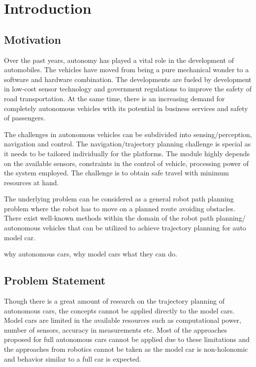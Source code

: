 \chapter{Introduction}
\label{introduction}
\section{Motivation}

Over the past years, autonomy has played a vital role in the development of automobiles. The vehicles have moved from being a pure mechanical wonder to a software and hardware combination. The developments are fueled by development in low-cost sensor technology and government regulations to improve the safety of road transportation. At the same time, there is an increasing demand for completely autonomous vehicles with its potential in business services and safety of passengers.

The challenges in autonomous vehicles can be subdivided into sensing/perception, navigation and control. The navigation/trajectory planning challenge is special as it needs to be tailored individually for the platforms. The module highly depends on the available sensors, constraints in the control of vehicle, processing power of the system employed.  The challenge is to obtain safe travel with minimum resources at hand. 

The underlying problem can be considered as a general robot path planning problem where the robot has to move on a planned route avoiding obstacles. There exist well-known methods within the domain of the robot path planning/ autonomous vehicles that can be utilized to achieve trajectory planning for auto model car. 

why autonomous cars, why model cars what they can do.

\section{Problem Statement}

Though there is a great amount of research on the trajectory planning of autonomous cars, the concepts cannot be applied directly to the model cars. Model cars are limited in the available resources such as computational power, number of sensors, accuracy in measurements etc. Most of the approaches proposed for full autonomous cars cannot be applied due to these limitations and the approaches from robotics cannot be taken as the model car is non-holonomic and behavior similar to a full car is expected. 

